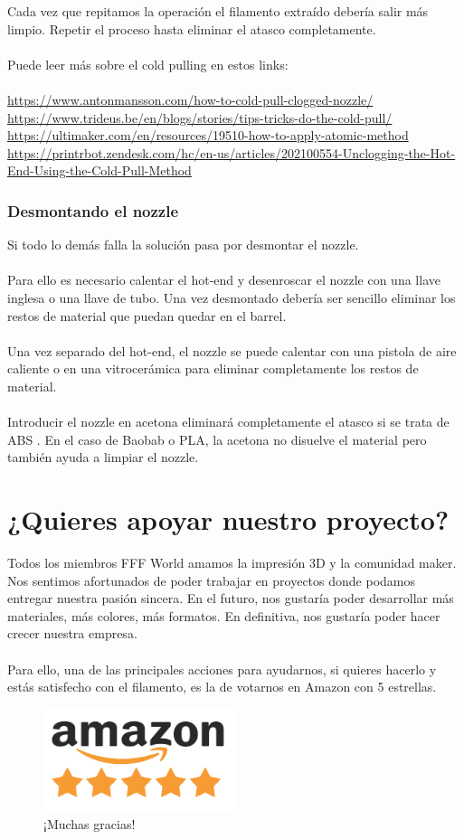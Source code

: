 \documentclass[11pt,a4paper]{article}
\begin{document}
Cada vez que repitamos la operación el filamento extraído debería salir más limpio. Repetir el proceso hasta eliminar el atasco completamente.\\\\
Puede leer más sobre el cold pulling en estos links: \\\\
\url{https://www.antonmansson.com/how-to-cold-pull-clogged-nozzle/}\\
\url{https://www.trideus.be/en/blogs/stories/tips-tricks-do-the-cold-pull/}\\
\url{https://ultimaker.com/en/resources/19510-how-to-apply-atomic-method}\\
\url{https://printrbot.zendesk.com/hc/en-us/articles/202100554-Unclogging-the-Hot-End-Using-the-Cold-Pull-Method}
	\subsubsection{Desmontando el nozzle}
Si todo lo demás falla la solución pasa por desmontar el nozzle.\\\\
Para ello es necesario calentar el hot-end y desenroscar el nozzle con una llave inglesa o una llave de tubo. Una vez desmontado debería ser sencillo eliminar los restos de material que puedan quedar en el barrel.\\\\
Una vez separado del hot-end, el nozzle se puede calentar con una pistola de aire caliente o en una vitrocerámica para eliminar completamente los restos de material.\\\\
Introducir el nozzle en acetona eliminará completamente el atasco si se trata de ABS . En el caso de Baobab o PLA, la acetona no disuelve el material pero también ayuda a limpiar el nozzle.\section{¿Quieres apoyar nuestro proyecto?}
Todos los miembros FFF World amamos la impresión 3D y la comunidad maker. Nos sentimos afortunados de poder trabajar en proyectos donde podamos entregar nuestra pasión sincera. En el futuro, nos gustaría poder desarrollar más materiales, más colores, más formatos. En definitiva, nos gustaría poder hacer crecer nuestra empresa.
\\\\
Para ello, una de las principales acciones para ayudarnos, si quieres hacerlo y estás satisfecho con el filamento, es la de votarnos en Amazon con 5 estrellas.
\begin{figure}[H]
\centering
\includegraphics[width=0.5\textwidth,cfbox=azul_marcos 1pt 0pt]{FOTOS/AMAZON_FIVE_STARS}
\caption*{¡Muchas gracias!}
\end{figure}
\end{document}
